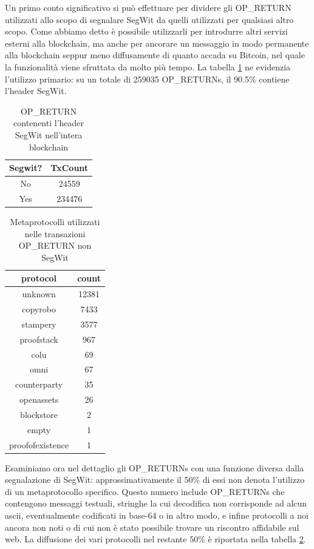 Un primo conto significativo si può effettuare per dividere gli OP\_RETURN utilizzati allo scopo di segnalare SegWit da quelli utilizzati per qualsiasi altro scopo. Come abbiamo detto è possibile utilizzarli per introdurre altri servizi esterni alla blockchain, ma anche per ancorare un messaggio in modo permanente alla blockchain seppur meno diffusamente di quanto accada su Bitcoin, nel quale la funzionalità viene sfruttata da molto più tempo. La tabella \ref{segwityn} ne evidenzia l'utilizzo primario: su un totale di 259035 OP\_RETURNs, il 90.5\% contiene l'header SegWit.

\begin{table}
\begin{tabular}{|c|c|}
	\hline 
	\textbf{Segwit?} & \textbf{TxCount} \\ 
	\hline 
	No & 24559 \\ 
	\hline 
	Yes & 234476 \\ 
	\hline 
\end{tabular} 
\caption{OP\_RETURN contenenti l'header SegWit nell'intera blockchain}
\label{segwityn}
\end{table}

\begin{table}
\begin{tabular}{|c|c|}
	\hline 
	\textbf{protocol}& \textbf{count}  \\ 
	\hline 
unknown	&  12381\\ 
	\hline 
copyrobo	&  7433\\ 
	\hline 
stampery	& 3577 \\ 
	\hline 
proofstack	& 967 \\ 
	\hline 
colu	& 69 \\ 
	\hline 
omni	& 67 \\ 
	\hline 
counterparty	& 35 \\ 
	\hline 
openassets	& 26 \\ 
	\hline 
blockstore	& 2 \\ 
	\hline 
empty	& 1 \\ 
	\hline 
proofofexistence	& 1 \\ 
	\hline 
\end{tabular}
\caption{Metaprotocolli utilizzati nelle transazioni OP\_RETURN non SegWit}
\label{protocols}
\end{table}

Esaminiamo ora nel dettaglio gli OP\_RETURNs con una funzione diversa dalla segnalazione di SegWit: approssimativamente il 50\% di essi non denota l’utilizzo di un metaprotocollo specifico. Questo numero include OP\_RETURNs che contengono messaggi testuali, stringhe la cui decodifica non corrisponde ad alcun ascii, eventualmente codificati in base-64 o in altro modo, e infine protocolli a noi ancora non noti o di cui non è stato possibile trovare un riscontro affidabile sul web.
La diffusione dei vari protocolli nel restante 50\% è riportata nella tabella \ref{protocols}.

